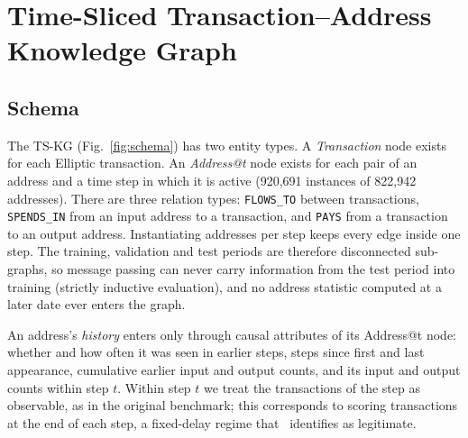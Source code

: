 \section{Time-Sliced Transaction--Address Knowledge Graph}\label{sec:kg}

\subsection{Schema}
The TS-KG (Fig.~\ref{fig:schema}) has two entity types. A \emph{Transaction}
node exists for each Elliptic transaction. An \emph{Address@t} node exists for
each pair of an address and a time step in which it is active (920{,}691
instances of 822{,}942 addresses). There are three relation types:
\texttt{FLOWS\_TO} between transactions, \texttt{SPENDS\_IN} from an input
address to a transaction, and \texttt{PAYS} from a transaction to an output
address. Instantiating addresses per step keeps every edge inside one step.
The training, validation and test periods are therefore disconnected
sub-graphs, so message passing can never carry information from the test
period into training (strictly inductive evaluation), and no address
statistic computed at a later date ever enters the graph.

An address's \emph{history} enters only through causal attributes of its
Address@t node: whether and how often it was seen in earlier steps, steps
since first and last appearance, cumulative earlier input and output counts,
and its input and output counts within step $t$. Within step $t$ we treat the
transactions of the step as observable, as in the original benchmark; this
corresponds to scoring transactions at the end of each step, a fixed-delay
regime that~\cite{safar2026} identifies as legitimate.

